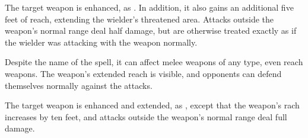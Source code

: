 \begin{spellheader}
    \begin{spelltargetinginfo}
    \end{spelltargetinginfo}
\end{spellheader}
\begin{spellcontent}
    \begin{spelleffects}
        \spelleffect The target weapon is enhanced, as . In addition, it also gains an additional five feet of reach, extending the wielder's threatened area. Attacks outside the weapon's normal range deal half damage, but are otherwise treated exactly as if the wielder was attacking with the weapon normally.
        \spelldur{\durshort}
    \end{spelleffects}
\end{spellcontent}
\begin{spellfooter}
    \spellnotes Despite the name of the spell, it can affect melee weapons of any type, even reach weapons. The weapon's extended reach is visible, and opponents can defend themselves normally against the attacks.
\end{spellfooter}

\begin{spellheader}
    \begin{spelltargetinginfo}
    \end{spelltargetinginfo}
\end{spellheader}
\begin{spellcontent}
    \begin{spelleffects}
        \spelleffect The target weapon is enhanced and extended, as , except that the weapon's rach increases by ten feet, and attacks outside the weapon's normal range deal full damage.
        \spelldur{\durshort}
    \end{spelleffects}
\end{spellcontent}
\begin{spellfooter}
\end{spellfooter}
